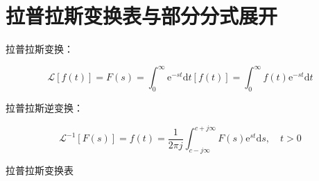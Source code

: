 \section{拉普拉斯变换表与部分分式展开}

拉普拉斯变换：

\begin{equation*}
    \mathscr{L}[f(t)]=F(s)=\int_{0}^{\infty} \mathrm{e}^{-s t} \mathrm{d} t[f(t)]=\int_{0}^{\infty} f(t) \mathrm{e}^{-s t} \mathrm{d} t
\end{equation*}

拉普拉斯逆变换：

\begin{equation*}
    \mathscr{L}^{-1}[F(s)]=f(t)=\frac{1}{2 \pi j} \int_{c-j \infty}^{c+j \infty} F(s) \mathrm{e}^{s t} \mathrm{d} s, \quad t>0
\end{equation*}

拉普拉斯变换表


